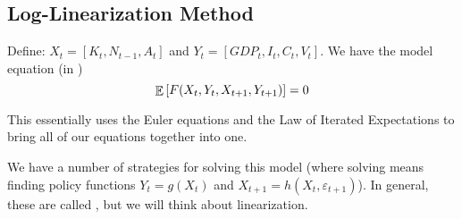\documentclass[10pt]{article}
\begin{document}
\subsection{Log-Linearization Method}
\begin{algorithm}
	 Define: $X_t = [K_t,N_{t-1},A_t]$ and $Y_t = [GDP_t,I_t,C_t,V_t]$. We have the model equation (in )
	\[
	\mathop{\mathbb{E}}\left[ F(X_t, Y_t, X_{t+1},Y_{t+1})\right] = 0
	\]
	\begin{remark}
		This essentially uses the Euler equations and the Law of Iterated Expectations to bring all of our equations together into one.
	\end{remark}
	
	We have a number of strategies for solving this model (where solving means finding policy functions $Y_t = g(X_t)$ and $X_{t+1} = h(X_t, \varepsilon_{t+1})$). In general, these are called , but we will think about linearization.
	

\end{algorithm}
\end{document}
